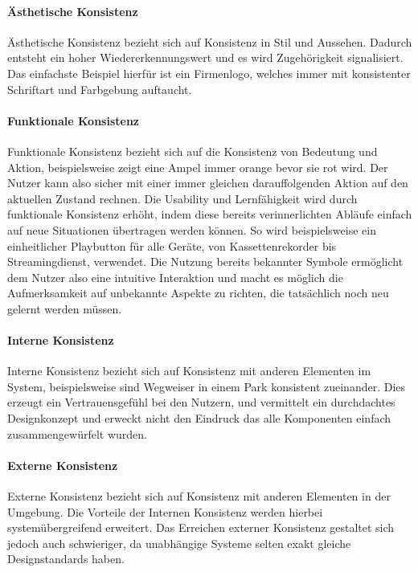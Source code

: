 \paragraph{Ästhetische Konsistenz}
Ästhetische Konsistenz bezieht sich auf Konsistenz in Stil und Aussehen. Dadurch entsteht ein hoher Wiedererkennungswert und es wird Zugehörigkeit signalisiert. Das einfachste Beispiel hierfür ist ein Firmenlogo, welches immer mit konsistenter Schriftart und Farbgebung auftaucht.

\paragraph{Funktionale Konsistenz}
Funktionale Konsistenz bezieht sich auf die Konsistenz von Bedeutung und Aktion, beispielsweise zeigt eine Ampel immer orange bevor sie rot wird. Der Nutzer kann also sicher mit einer immer gleichen darauffolgenden Aktion auf den aktuellen Zustand rechnen. 
Die Usability und Lernfähigkeit wird durch funktionale Konsistenz erhöht, indem diese bereits verinnerlichten Abläufe einfach auf neue Situationen übertragen werden können. So wird beispielsweise ein einheitlicher Playbutton für alle Geräte, von Kassettenrekorder bis Streamingdienst, verwendet.
Die Nutzung bereits bekannter Symbole ermöglicht dem Nutzer also eine intuitive Interaktion und macht es möglich die Aufmerksamkeit auf unbekannte Aspekte zu richten, die tatsächlich noch neu gelernt werden müssen.

\paragraph{Interne Konsistenz}
Interne Konsistenz bezieht sich auf Konsistenz mit anderen Elementen im System, beispielsweise sind Wegweiser in einem Park konsistent zueinander.
Dies erzeugt ein Vertrauensgefühl bei den Nutzern, und vermittelt ein durchdachtes Designkonzept und erweckt nicht den Eindruck das alle Komponenten einfach zusammengewürfelt wurden.

\paragraph{Externe Konsistenz}
Externe Konsistenz bezieht sich auf Konsistenz mit anderen Elementen in der Umgebung. Die Vorteile der Internen Konsistenz werden hierbei systemübergreifend erweitert. Das Erreichen externer Konsistenz gestaltet sich jedoch auch schwieriger, da unabhängige Systeme selten exakt gleiche Designstandards haben.

